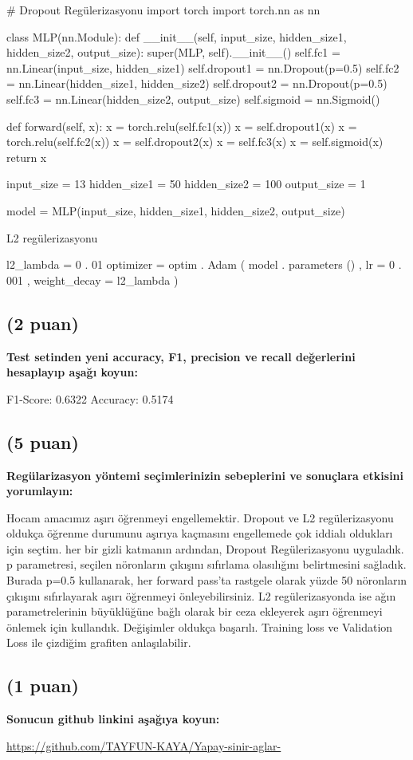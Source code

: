 \documentclass[11pt]{article}
\begin{document}
\begin{python}
# Dropout Regülerizasyonu
import torch
import torch.nn as nn

class MLP(nn.Module):
    def __init__(self, input_size, hidden_size1, hidden_size2, output_size):
        super(MLP, self).__init__()
        self.fc1 = nn.Linear(input_size, hidden_size1)
        self.dropout1 = nn.Dropout(p=0.5)
        self.fc2 = nn.Linear(hidden_size1, hidden_size2)
        self.dropout2 = nn.Dropout(p=0.5)
        self.fc3 = nn.Linear(hidden_size2, output_size)
        self.sigmoid = nn.Sigmoid()
        
    def forward(self, x):
        x = torch.relu(self.fc1(x))
        x = self.dropout1(x)
        x = torch.relu(self.fc2(x))
        x = self.dropout2(x)
        x = self.fc3(x)
        x = self.sigmoid(x)
        return x
        
input_size = 13
hidden_size1 = 50
hidden_size2 = 100
output_size = 1

model = MLP(input_size, hidden_size1, hidden_size2, output_size)

\end{python}

L2 regülerizasyonu

\begin{python}
l2_lambda = 0 . 01
optimizer = optim . Adam ( model . parameters () , lr = 0 . 001 , weight_decay = l2_lambda )
\end{python}

\subsection{(2 puan)} \textbf{Test setinden yeni accuracy, F1, precision ve recall değerlerini hesaplayıp aşağı koyun:}

F1-Score: 0.6322
Accuracy: 0.5174

\subsection{(5 puan)} \textbf{Regülarizasyon yöntemi seçimlerinizin sebeplerini ve sonuçlara etkisini yorumlayın:}

Hocam amacımız aşırı öğrenmeyi engellemektir. Dropout ve L2 regülerizasyonu oldukça öğrenme durumunu aşırıya kaçmasını engellemede çok iddialı oldukları için seçtim. her bir gizli katmanın ardından, Dropout Regülerizasyonu uyguladık. p parametresi, seçilen nöronların çıkışını sıfırlama olasılığını belirtmesini sağladık. Burada p=0.5 kullanarak, her forward pass'ta rastgele olarak yüzde 50 nöronların çıkışını sıfırlayarak aşırı öğrenmeyi önleyebilirsiniz. 
L2 regülerizasyonda ise ağın parametrelerinin büyüklüğüne bağlı olarak bir ceza ekleyerek aşırı öğrenmeyi önlemek için kullandık. Değişimler oldukça başarılı. Training loss ve Validation Loss ile çizdiğim grafiten anlaşılabilir.

\subsection{(1 puan)} \textbf{Sonucun github linkini  aşağıya koyun:}

\url{https://github.com/TAYFUN-KAYA/Yapay-sinir-aglar-}
\end{document}
